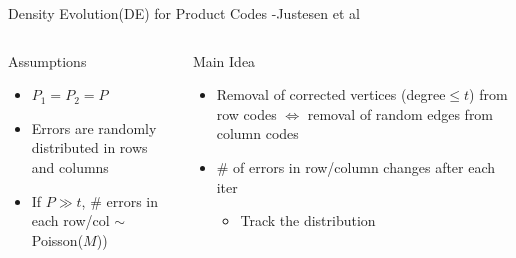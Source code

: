 \documentclass[10pt,xcolor=table]{beamer}
\begin{document}
	\begin{frame}{Density Evolution(DE) for Product Codes -Justesen et al}
	
	   \begin{columns}
	   	
	   	\begin{block}{Assumptions}
	   		
	   		\begin{itemize}
	   			\item $P_1=P_2 = P$
	   			\item Errors are \alert{randomly distributed} in rows and columns
	   			\item If $P \gg t$, \alert{\# errors} in each row/col $\sim$ \alert{Poisson}($M$))
	   		\end{itemize}
	   	\end{block}
	   	\pause
	   	\begin{block}{Main Idea}
	   		\begin{itemize}
	   			\item Removal of \alert{corrected vertices} (degree$\leq t$) from row codes $\Leftrightarrow$ removal of random edges from column codes
	   			\item \# of errors in row/column changes after each iter
	   			\begin{itemize}
	   				\item Track the distribution
	   			\end{itemize}
	   		\end{itemize}
	   	\end{block}
	   	 	

\end{columns}
\end{frame}
\end{document}
